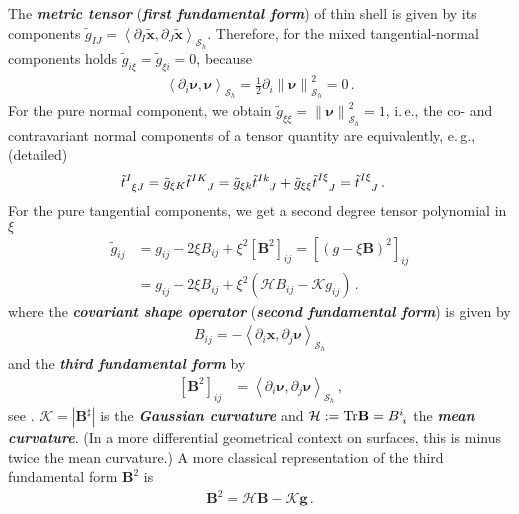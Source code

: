 \documentclass[a4paper,10pt]{scrartcl}
\newcommand{\surf}{\mathcal{S}}
\newcommand{\surfh}{\surf_{h}}
\newcommand{\Tr}{\text{Tr}}
\newcommand{\xb}{\mathbf{x}}
\newcommand{\txb}{\tilde{\xb}}
\newcommand{\nub}{\bm{\nu}}
\newcommand{\gb}{\mathbf{g}}
\newcommand{\tg}{\tilde{g}}
\newcommand{\Bb}{\mathbf{B}}
\newcommand{\ttt}{\tilde{t}}
\newcommand{\meanc}{\mathcal{H}}
\newcommand{\gaussc}{\mathcal{K}}
\newcommand{\formComma}{\,\text{,}}
\newcommand{\formPeriod}{\,\text{.}}
\newcommand{\ie}{i.\,e.}%
\newcommand{\eg}{e.\,g.}
\newcommand{\newterm}[1]{\textbf{\textit{#1}}}
\begin{document}
The \newterm{metric tensor} (\newterm{first fundamental form}) of thin shell is given by its components \( \tg_{IJ} = \left\langle \partial_{I}\txb , \partial_{J}\txb \right\rangle_{\surfh} \).
Therefore, for the mixed tangential-normal components holds \( \tg_{i\xi} = \tg_{\xi i} = 0 \), 
because 
\begin{align}
 \left\langle \partial_{i}\nub , \nub \right\rangle_{\surfh} = \frac{1}{2}\partial_{i}\left\| \nub \right\|^{2}_{\surfh} = 0 \formPeriod
\end{align}
For the pure normal component, we obtain \( \tg_{\xi\xi} = \left\| \nub \right\|^{2}_{\surfh} = 1 \),
\ie, the co- and contravariant normal components of a tensor quantity are equivalently,
\eg, (detailed)
\begin{align}
 \tensor{\ttt}{^{I}_{\xi J}} &= \tg_{\xi K} \tensor{\ttt}{^{IK}_{J}} 
                          = \tg_{\xi k} \tensor{\ttt}{^{Ik}_{J}} + \tg_{\xi \xi} \tensor{\ttt}{^{I\xi}_{J}}
                          = \tensor{\ttt}{^{I\xi}_{J}} \formPeriod
\end{align}
For the pure tangential components, we get a second degree tensor polynomial in \( \xi \)
\begin{align}
  \tg_{ij} &= g_{ij} - 2\xi B_{ij} + \xi^{2}\left[ \Bb^{2} \right]_{ij}
            = \left[ \left( g - \xi\Bb \right)^{2} \right]_{ij}\\
           &= g_{ij} - 2\xi B_{ij} + \xi^{2}\left( \meanc B_{ij} - \gaussc g_{ij} \right) \formPeriod
\end{align}
where the \newterm{covariant shape operator} (\newterm{second fundamental form}) is given by 
\begin{align}
 B_{ij} = -\left\langle \partial_{i}\xb , \partial_{j}\nub  \right\rangle_{\surfh} 
\end{align}
and the \newterm{third fundamental form} by
\begin{align}
 \left[ \Bb^{2} \right]_{ij} &= \left\langle \partial_{i}\nub , \partial_{j}\nub  \right\rangle_{\surfh}\formComma
\end{align}
see \cite{HartmanWintner1953}.
\( \gaussc = \left| \Bb^{\sharp} \right| \) is the \newterm{Gaussian curvature} and \( \meanc := \Tr\Bb = \tensor{B}{^{i}_{i}} \) the \newterm{mean curvature}.
(In a more differential geometrical context on surfaces, this is minus twice the mean curvature.)
A more classical representation of the third fundamental form \( \Bb^{2} \) is
\begin{align}\label{eq:shapesquare}
  \Bb^{2} = \meanc\Bb - \gaussc\gb\formPeriod
\end{align}
\end{document}
